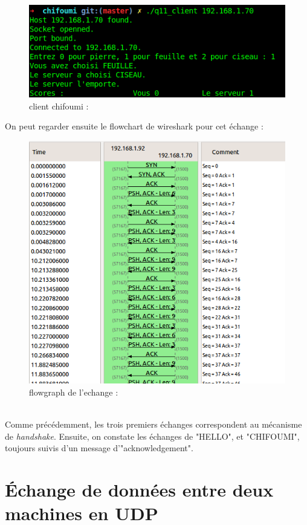 \documentclass[10pt,a4paper,final]{article}
\begin{document}
		\begin{figure}[!h] 
			\centering
			\caption{client chifoumi :}
			\includegraphics[scale=0.5]{img/chifoumi_terminal.png} 
		\end{figure}
		\newpage
		On peut regarder ensuite le flowchart de wireshark pour cet échange :\\
		\begin{figure}[!h] 
			\centering
			\caption{flowgraph de l'echange :}
			\includegraphics[scale=0.6]{img/chifoumi_flowgraph.png} 
		\end{figure}		
		\\
		Comme précédemment, les trois premiers échanges correspondent au mécanisme de \textit{\textrm{handshake}}. Ensuite, on constate les échanges de "HELLO", et "CHIFOUMI", 
		toujours suivis d'un message d'"acknowledgement".
		

\section{Échange de données entre deux machines en UDP}
\end{document}
